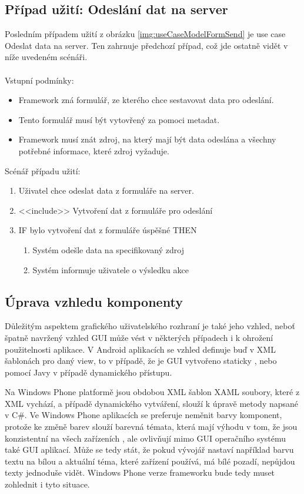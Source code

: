 \subsection{Případ užití: Odeslání dat na server}
Posledním případem užití z obrázku \ref{img:useCaseModelFormSend} je use case Odeslat data na server. Ten zahrnuje předchozí případ, což jde ostatně vidět v níže uvedeném scénáři.\\\\
Vstupní podmínky:
\begin{itemize}
\item Framework zná formulář, ze kterého chce sestavovat data pro odeslání.
\item Tento formulář musí být vytovřený za pomoci metadat.
\item Framework musí znát zdroj, na který mají být data odeslána a všechny potřebné informace, které zdroj vyžaduje. 
\end{itemize}
Scénář případu užití:
\begin{enumerate}
\item Uživatel chce odeslat data z formuláře na server.
\item <<include>> Vytvoření dat z formuláře pro odeslání
\item IF bylo vytvoření dat z formuláře úspěšné THEN
\begin{enumerate}
\item Systém odešle data na specifikovaný zdroj
\item Systém informuje uživatele o výsledku akce
\end{enumerate}
\end{enumerate}

\subsection{Úprava vzhledu komponenty}
Důležitým aspektem grafického uživatelského rozhraní je také jeho vzhled, neboť špatně navržený vzhled GUI může vést v některých případech i k ohrožení použitelnosti aplikace. V Android aplikacích se vzhled definuje buď v XML šablonách pro daný view, to v případě, že je GUI vytvořeno staticky \cite{android-themes}, nebo pomocí Javy v případě dynamického přístupu. 

Na Windows Phone platformě jsou obdobou XML šablon XAML soubory, které z XML vychází, a případě dynamického vytváření, slouží k úpravě metody napsané v C\#. Ve Windows Phone aplikacích se preferuje neměnit barvy komponent, protože ke změně barev slouží barevná témata, která mají výhodu v tom, že jsou konzistentní na všech zařízeních \cite{wp-themes}, ale ovlivňují mimo GUI operačního systému také GUI aplikací. Může se tedy stát, že pokud vývojář nastaví například barvu textu na bílou a aktuální téma, které zařízení používá, má bílé pozadí, nepůjdou texty jednoduše vidět. Windows Phone verze frameworku bude tedy muset zohlednit i tyto situace.  

